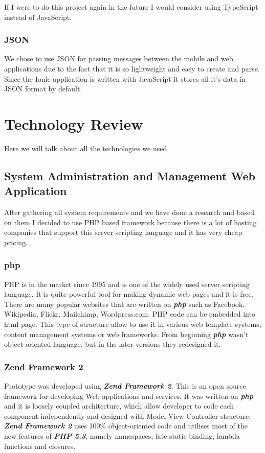 If I were to do this project again in the future I would consider using TypeScript instead of JavaScript.

\subsection{JSON}
We chose to use JSON for passing messages between the mobile and web applications due to the fact that it is so lightweight and easy to create and parse.
Since the Ionic application is written with JavaScript it stores all it's data in JSON format by default.


\chapter{Technology Review} %
Here we will talk about all the technologies we used.

  \section{System Administration and Management Web Application}	%
  After gathering all system requirements and we have done a research and based on them I decided to use PHP based framework because there is a lot of hosting companies that support this server scripting language and it has very cheap pricing.
  

    \subsection{php}
	PHP is in the market since 1995 and is one of the widely used server scripting language. It is quite powerful tool for making dynamic web pages and it is free. There are many popular websites that are written on \textbf{\textit{php}} such as Facebook, Wikipedia, Flickr, Mailchimp, Wordpress.com. PHP code can be embedded into html page. This type of structure allow to use it in various web template systems, content management systems or web frameworks. From beginning \textbf{\textit{php}} wasn't object oriented language, but in the later versions they redesigned it.

    \subsection{Zend Framework 2}
		Prototype was developed using \textbf{\textit{Zend Framework 2}}. This is an open source framework for developing Web applications and services. It was written on \textbf{\textit{php}} and it is loosely coupled architecture, which allow developer to code each component independently and designed with Model View Controller structure. \textbf{\textit{Zend Framework 2}} uses 100\% object-oriented code and utilises most of the new features of \textbf{\textit{PHP 5.3}}, namely namespaces, late static binding, lambda functions and closures.~\cite{ZendFramework-Website-About}
		
